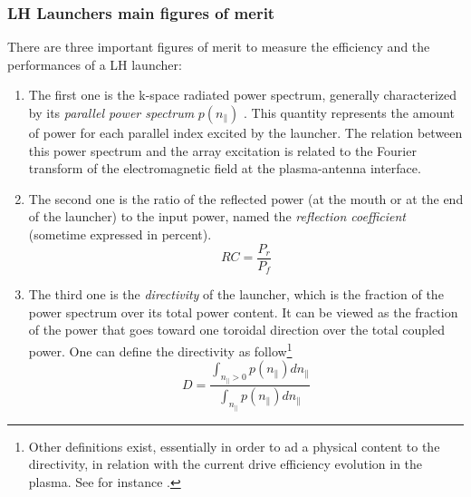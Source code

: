 {%
%
%


\subsubsection{LH Launchers main figures of merit}

There are three important figures of merit to measure the efficiency and the performances of a LH launcher: 
\begin{enumerate}
	\item The first one is the k-space radiated power spectrum, generally characterized by its \emph{parallel power spectrum} $p(n_{\parallel})$ . This quantity represents the amount of power for each parallel index excited by the launcher. The relation between this power spectrum and the array excitation is related to the Fourier transform of the electromagnetic field at the plasma-antenna interface. 
	
	\item  The second one is the ratio of the reflected power (at the mouth or at the end of the launcher) to the input power, named the \emph{reflection coefficient} (sometime expressed in percent). 
	$$RC = \frac{P_r}{P_f}$$
	\item The third one is the \emph{directivity} of the launcher, which is the fraction of the power spectrum over its total power content. It can be viewed as the fraction of the power that goes toward one toroidal direction over the total coupled power. One can define the directivity as follow\footnote{Other definitions exist, essentially in order to ad a physical content to the directivity, in relation with the current drive efficiency evolution in the plasma. See for instance .}
	$$
	D
	= 
	\frac{
		\int_{n_{\parallel} >0} p(n_{\parallel}) dn_{\parallel} 
	}{
		\int_{n_{\parallel}} p(n_{\parallel}) dn_{\parallel} } 
	$$
\end{enumerate}

}
